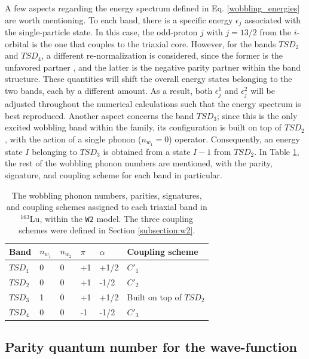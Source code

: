 \documentclass[11pt]{article}
\begin{document}
A few aspects regarding the energy spectrum defined in Eq. \ref{wobbling_energies} are worth mentioning. To each band, there is a specific energy $\epsilon_j$ associated with the single-particle state. In this case, the odd-proton $j$ with $j=13/2$ from the $i$-orbital is the one that couples to the triaxial core. However, for the bands $TSD_2$ and $TSD_4$, a different re-normalization is considered, since the former is the unfavored partner , and the latter is the negative parity partner within the band structure. These quantities will shift the overall energy states belonging to the two bands, each by a different amount. As a result, both $\epsilon_j^1$ and $\epsilon_j^2$ will be adjusted throughout the numerical calculations such that the energy spectrum is best reproduced. Another aspect concerns the band $TSD_3$; since this is the only excited wobbling band within the family, its configuration is built on top of $TSD_2$, with the action of a single phonon ($n_{w_1}=0$) operator. Consequently, an energy state $I$ belonging to $TSD_3$ is obtained from a state $I-1$ from $TSD_2$. In Table \ref{energy-states-tabular}, the rest of the wobbling phonon numbers are mentioned, with the parity, signature, and coupling scheme for each band in particular.

\begin{table}
\centering
\begin{tabular}{llllll}
\hline
Band & $n_{w_1}$ & $n_{w_2}$ & $\pi$ & $\alpha$ & Coupling scheme\\
\hline
\hline
   $TSD_1$  &   0        &    0       & +1      &    +1/2      &   $C'_1$              \\
   $TSD_2$  &     0      &      0     &   +1    &  -1/2        &   $C'_2$              \\
   $TSD_3$  &   1        &      0     &     +1  &     +1/2    &  Built on top of $TSD_2$                \\
   $TSD_4$  &    0       &      0     &      -1 &   -1/2       &    $C'_3$    \\       
   \hline
\end{tabular}
\caption{The wobbling phonon numbers, parities, signatures, and coupling schemes assigned to each triaxial band in $^{163}$Lu, within the \texttt{W2} model. The three coupling schemes were defined in Section \ref{subsection:w2}.}
\label{energy-states-tabular}
\end{table}

\subsection{Parity quantum number for the wave-function}
\end{document}
